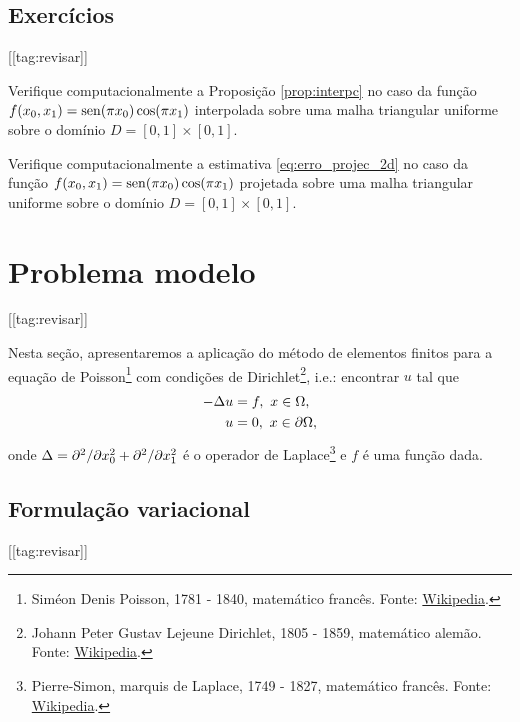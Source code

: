 \subsection{Exercícios}
[[tag:revisar]]


\begin{exer}
  Verifique computacionalmente a Proposição \ref{prop:interpc} no caso da função $f(x_0,x_1) = \operatorname{sen}(\pi x_0)\cos(\pi x_1)$ interpolada sobre uma malha triangular uniforme sobre o domínio $D = [0, 1]\times [0, 1]$.
\end{exer}

\begin{exer}
  Verifique computacionalmente a estimativa \eqref{eq:erro_projec_2d} no caso da função $f(x_0,x_1) = \operatorname{sen}(\pi x_0)\cos(\pi x_1)$ projetada sobre uma malha triangular uniforme sobre o domínio $D = [0, 1]\times [0, 1]$.
\end{exer}

\section{Problema modelo}\label{cap_mef2d_sec_probmodelo}
[[tag:revisar]]


Nesta seção, apresentaremos a aplicação do método de elementos finitos para a equação de Poisson\footnote{Siméon Denis Poisson, 1781 - 1840, matemático francês. Fonte: \href{https://en.wikipedia.org/wiki/Sim\%C3\%A9on_Denis_Poisson}{Wikipedia}.} com condições de Dirichlet\footnote{Johann Peter Gustav Lejeune Dirichlet, 1805 - 1859, matemático alemão. Fonte: \href{https://en.wikipedia.org/wiki/Peter_Gustav_Lejeune_Dirichlet}{Wikipedia}.}, i.e.: encontrar $u$ tal que
\begin{align}
  -\Delta u &= f,~x\in\Omega,\label{eq:mef2d_pm_eq}\\
  u &= 0,~x\in\partial\Omega,\label{eq:mef2d_pm_bc}
\end{align}
onde $\Delta = \partial^2/\partial x_0^2 + \partial^2/\partial x_1^2$ é o operador de Laplace\footnote{Pierre-Simon, marquis de Laplace, 1749 - 1827, matemático francês. Fonte: \href{https://en.wikipedia.org/wiki/Pierre-Simon_Laplace}{Wikipedia}.} e $f$ é uma função dada.

\subsection{Formulação variacional}
[[tag:revisar]]


